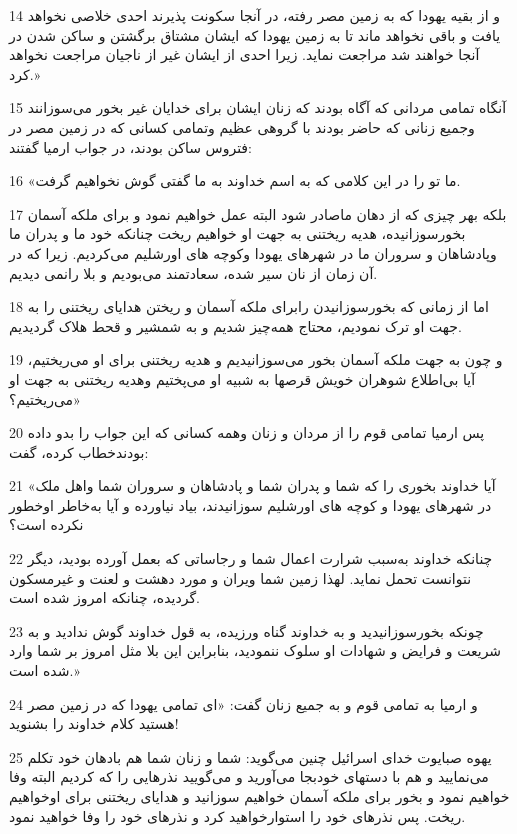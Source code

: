 \par 14 و از بقیه یهودا که به زمین مصر رفته، در آنجا سکونت پذیرند احدی خلاصی نخواهد یافت و باقی نخواهد ماند تا به زمین یهودا که ایشان مشتاق برگشتن و ساکن شدن در آنجا خواهند شد مراجعت نماید. زیرا احدی از ایشان غیر از ناجیان مراجعت نخواهد کرد.»
\par 15 آنگاه تمامی مردانی که آگاه بودند که زنان ایشان برای خدایان غیر بخور می‌سوزانند وجمیع زنانی که حاضر بودند با گروهی عظیم وتمامی کسانی که در زمین مصر در فتروس ساکن بودند، در جواب ارمیا گفتند:
\par 16 «ما تو را در این کلامی که به اسم خداوند به ما گفتی گوش نخواهیم گرفت.
\par 17 بلکه بهر چیزی که از دهان ماصادر شود البته عمل خواهیم نمود و برای ملکه آسمان بخور‌سوزانیده، هدیه ریختنی به جهت او خواهیم ریخت چنانکه خود ما و پدران ما وپادشاهان و سروران ما در شهرهای یهودا وکوچه های اورشلیم می‌کردیم. زیرا که در آن زمان از نان سیر شده، سعادتمند می‌بودیم و بلا رانمی دیدیم.
\par 18 اما از زمانی که بخور‌سوزانیدن رابرای ملکه آسمان و ریختن هدایای ریختنی را به جهت او ترک نمودیم، محتاج همه‌چیز شدیم و به شمشیر و قحط هلاک گردیدیم.
\par 19 و چون به جهت ملکه آسمان بخور می‌سوزانیدیم و هدیه ریختنی برای او می‌ریختیم، آیا بی‌اطلاع شوهران خویش قرصها به شبیه او می‌پختیم وهدیه ریختنی به جهت او می‌ریختیم؟»
\par 20 پس ارمیا تمامی قوم را از مردان و زنان وهمه کسانی که این جواب را بدو داده بودندخطاب کرده، گفت:
\par 21 «آیا خداوند بخوری را که شما و پدران شما و پادشاهان و سروران شما واهل ملک در شهرهای یهودا و کوچه های اورشلیم سوزانیدند، بیاد نیاورده و آیا به‌خاطر اوخطور نکرده است؟
\par 22 چنانکه خداوند به‌سبب شرارت اعمال شما و رجاساتی که بعمل آورده بودید، دیگر نتوانست تحمل نماید. لهذا زمین شما ویران و مورد دهشت و لعنت و غیرمسکون گردیده، چنانکه امروز شده است.
\par 23 چونکه بخور‌سوزانیدید و به خداوند گناه ورزیده، به قول خداوند گوش ندادید و به شریعت و فرایض و شهادات او سلوک ننمودید، بنابراین این بلا مثل امروز بر شما وارد شده است.»
\par 24 و ارمیا به تمامی قوم و به جمیع زنان گفت: «ای تمامی یهودا که در زمین مصر هستید کلام خداوند را بشنوید!
\par 25 یهوه صبایوت خدای اسرائیل چنین می‌گوید: شما و زنان شما هم بادهان خود تکلم می‌نمایید و هم با دستهای خودبجا می‌آورید و می‌گویید نذرهایی را که کردیم البته وفا خواهیم نمود و بخور برای ملکه آسمان خواهیم سوزانید و هدایای ریختنی برای اوخواهیم ریخت. پس نذرهای خود را استوارخواهید کرد و نذرهای خود را وفا خواهید نمود.
